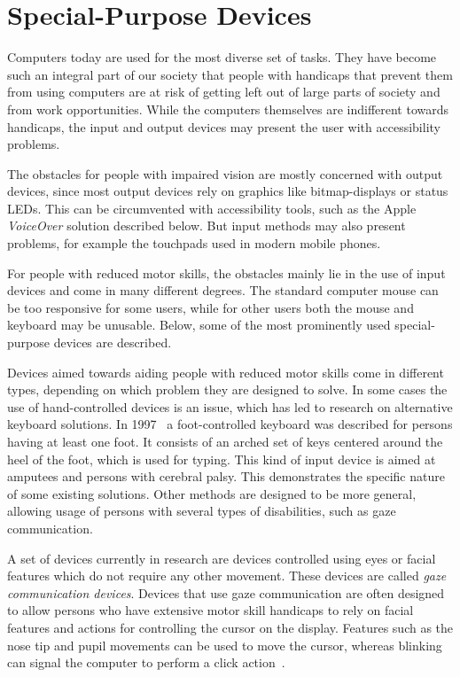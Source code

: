 
\section{Special-Purpose Devices}

Computers today are used for the most diverse set of tasks. They have become such an integral part of our society that people with handicaps that prevent them from using computers are at risk of getting left out of large parts of society and from work opportunities. While the computers themselves are indifferent towards handicaps, the input and output devices may present the user with accessibility problems.

The obstacles for people with impaired vision are mostly concerned with output devices, since most output devices rely on graphics like bitmap-displays or status LEDs. This can be circumvented with accessibility tools, such as the Apple \emph{VoiceOver} solution described below. But input methods may also present problems, for example the touchpads used in modern mobile phones.

For people with reduced motor skills, the obstacles mainly lie in the use of input devices and come in many different degrees. The standard computer mouse can be too responsive for some users, while for other users both the mouse and keyboard may be unusable. Below, some of the most prominently used special-purpose devices are described.

Devices aimed towards aiding people with reduced motor skills come in different types, depending on which problem they are designed to solve. In some cases the use of hand-controlled devices is an issue, which has led to research on alternative keyboard solutions. In 1997~\cite{583209} a foot-controlled keyboard was described for persons having at least one foot. It consists of an arched set of keys centered around the heel of the foot, which is used for typing. This kind of input device is aimed at amputees and persons with cerebral palsy. This demonstrates the specific nature of some existing solutions. Other methods are designed to be more general, allowing usage of persons with several types of disabilities, such as gaze communication.

A set of devices currently in research are devices controlled using eyes or facial features which do not require any other movement. These devices are called \emph{gaze communication devices}. Devices that use gaze communication are often designed to allow persons who have extensive motor skill handicaps to rely on facial features and actions for controlling the cursor on the display. Features such as the nose tip and pupil movements can be used to move the cursor, whereas blinking can signal the computer to  perform a click action~\cite{ieee6398171, conf/itng/AraiM11a}.

